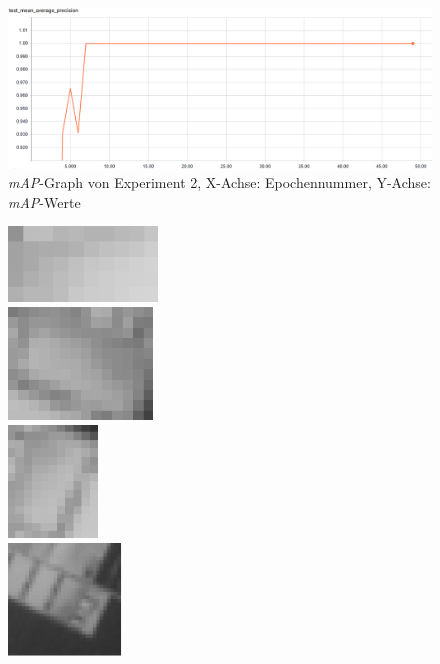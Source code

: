 \begin{figure}[ht]
	\centering
    \includegraphics[width=.7\textwidth]{pics/map-2.PNG}
    \caption{\textit{mAP}-Graph von Experiment 2, X-Achse: Epochennummer, Y-Achse: \textit{mAP}-Werte}
    \label{fig:map-2}
\end{figure}

\begin{figure}[ht]
  \centering
  \begin{minipage}[c]{.3\textwidth}
  \centering
  \includegraphics[height=2cm]{pics/roi-2-1.png}
  \\ \vspace{.25cm}
  \includegraphics[height=3cm]{pics/roi-2-2.png}
  \\ \vspace{.25cm}
  \includegraphics[height=3cm]{pics/roi-2-3.png}
  \\ \vspace{.25cm}
  \includegraphics[height=3cm]{pics/roi-2-4.png}

\end{minipage}
\end{figure}
